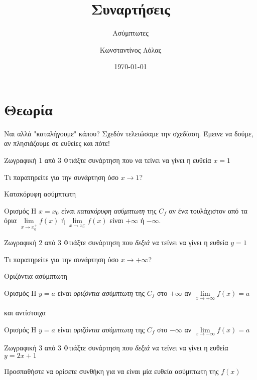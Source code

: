 \documentclass{../presentation}
\title{Συναρτήσεις}
\subtitle{Ασύμπτωτες}
\author[Λόλας]{Κωνσταντίνος Λόλας}
\institute[$10^ο$ ΓΕΛ]{$10^ο$ ΓΕΛ Θεσσαλονίκης}
\date{\today}
\begin{document}
\begin{frame}
  \titlepage
\end{frame}

\section{Θεωρία}
\begin{frame}{Ναι αλλά "καταλήγουμε" κάπου?}
  Σχεδόν τελειώσαμε την σχεδίαση. Έμεινε να δούμε, αν πλησιάζουμε σε ευθείες και πότε!
\end{frame}

\begin{frame}{Ζωγραφική 1 από 3}
  Φτιάξτε συνάρτηση που να τείνει να γίνει η ευθεία $x=1$

   Τι παρατηρείτε για την συνάρτηση όσο $x\to 1$?
\end{frame}

\begin{frame}{Κατακόρυφη ασύμπτωτη}
  \begin{block}{Ορισμός}
    Η $x=x_0$ είναι \emph{κατακόρυφη ασύμπτωτη} της $C_f$ αν ένα τουλάχιστον από τα όρια $\lim\limits_{x \to x_0^+}{ f(x) }$ ή $\lim\limits_{x \to x_0^-}{ f(x) }$ είναι $+\infty$ ή $-\infty$.
  \end{block}
\end{frame}

\begin{frame}{Ζωγραφική 2 από 3}
  Φτιάξτε συνάρτηση που \emph{δεξιά} να τείνει να γίνει η ευθεία $y=1$

   Τι παρατηρείτε για την συνάρτηση όσο $x\to +\infty$?
\end{frame}

\begin{frame}{Οριζόντια ασύμπτωτη}
  \begin{block}{Ορισμός}
    Η $y=a$ είναι \emph{οριζόντια ασύμπτωτη} της $C_f$ στο $+\infty$ αν $\lim\limits_{x \to +\infty}{ f(x) }=a$
  \end{block}
  και αντίστοιχα
  \begin{block}{Ορισμός}
    Η $y=a$ είναι \emph{οριζόντια ασύμπτωτη} της $C_f$ στο $-\infty$ αν $\lim\limits_{x \to -\infty}{ f(x) }=a$
  \end{block}
\end{frame}

\begin{frame}{Ζωγραφική 3 από 3}
  Φτιάξτε συνάρτηση που \emph{δεξιά} να τείνει να γίνει η ευθεία $y=2x+1$

   Προσπαθήστε να ορίσετε συνθήκη για να είναι μία ευθεία ασύμπτωτη της $f(x)$
\end{frame}
\end{document}
